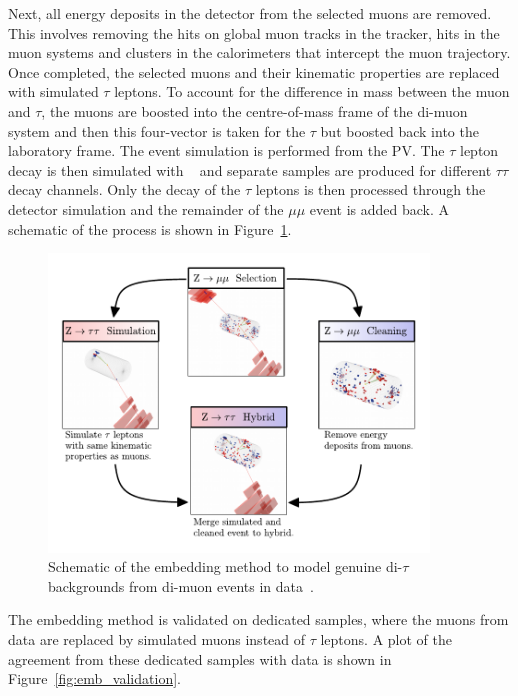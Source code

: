 Next, all energy deposits in the detector from the selected muons are removed.
This involves removing the hits on global muon tracks in the tracker, hits in the muon systems and clusters in the calorimeters that intercept the muon trajectory.
Once completed, the selected muons and their kinematic properties are replaced with simulated $\tau$ leptons.
To account for the difference in mass between the muon and $\tau$, the muons are boosted into the centre-of-mass frame of the di-muon system and then this four-vector is taken for the $\tau$ but boosted back into the laboratory frame.
The event simulation is performed from the \ac{PV}.
The $\tau$ lepton decay is then simulated with \PYTHIA~\cite{Sirunyan:2019dfx,Sjostrand:2014zea} and separate samples are produced for different $\tau\tau$ decay channels.
Only the decay of the $\tau$ leptons is then processed through the detector simulation and the remainder of the $\mu\mu$ event is added back.
A schematic of the process is shown in Figure~\ref{fig:embedding}. \\

\begin{figure}[!hbtp]
\centering
    \includegraphics[width=0.9\textwidth]{Figures/Embedding_Diagram.pdf}
\caption[Diagram of the embedding method.]{Schematic of the embedding method to model genuine di-$\tau$ backgrounds from di-muon events in data~\cite{CMS_embedding}.}
\label{fig:embedding}
\end{figure}

The embedding method is validated on dedicated samples, where the muons from data are replaced by simulated muons instead of $\tau$ leptons.
A plot of the agreement from these dedicated samples with data is shown in Figure~\ref{fig:emb_validation}.

